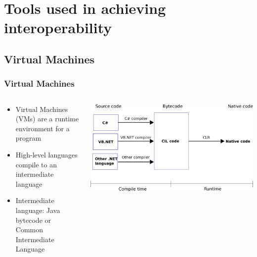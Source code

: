 \documentclass{beamer}
\begin{document}
\section[Interop Tools]{Tools used in achieving interoperability}

\subsection{Virtual Machines}

\begin{frame}
  \frametitle{Virtual Machines}
  
  \begin{columns}
  \begin{column}{0.6\textwidth}
  \begin{itemize}
	\item Virtual Machines (VMs) are a runtime environment for a program
	\item High-level languages compile to an intermediate language
	\item Intermediate language: Java bytecode or Common Intermediate Language
  \end{itemize}
  \end{column}
  
  \begin{column}{0.5\textwidth}
  \includegraphics[width=1\textwidth]{graphics/CLR.png}
    \\
  \end{column}
  \end{columns}
\end{frame}
\end{document}
